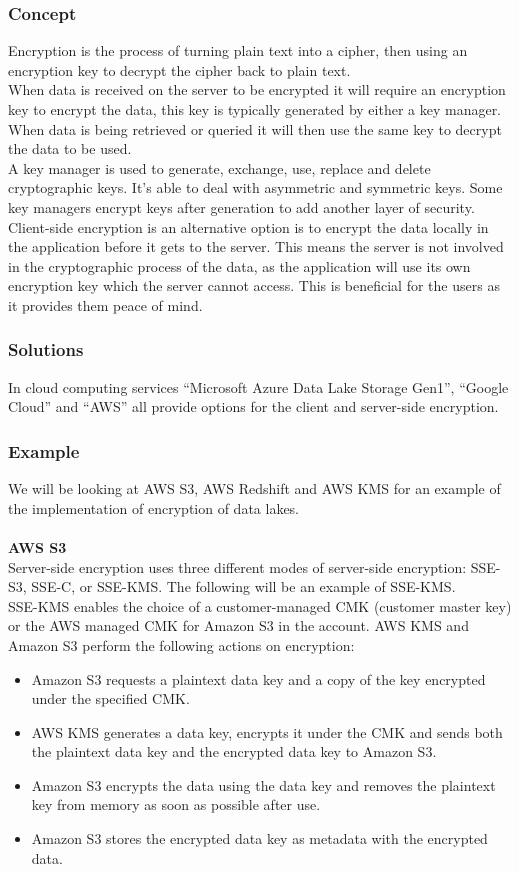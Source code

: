 \documentclass[10pt]{article}
\begin{document}
\subsubsection{Concept}
Encryption is the process of turning plain text into a cipher, then using an encryption key to decrypt the cipher back to plain text.
\\
When data is received on the server to be encrypted it will require an encryption key to encrypt the data, this key is typically generated by either a key manager. When data is being retrieved or queried it will then use the same key to decrypt the data to be used.
\\
A key manager is used to generate, exchange, use, replace and delete cryptographic keys. It's able to deal with asymmetric and symmetric keys. Some key managers encrypt keys after generation to add another layer of security.
\\
Client-side encryption is an alternative option is to encrypt the data locally in the application before it gets to the server. This means the server is not involved in the cryptographic process of the data, as the application will use its own encryption key which the server cannot access. This is beneficial for the users as it provides them peace of mind.
\subsubsection{Solutions}
In cloud computing services “Microsoft Azure Data Lake Storage Gen1”, “Google Cloud” and “AWS” all provide options for the client and server-side encryption.
\subsubsection{Example}
We will be looking at AWS S3, AWS Redshift and AWS KMS for an example of the implementation of encryption of data lakes.
\\\\\textbf{AWS S3}\\
Server-side encryption uses three different modes of server-side encryption: SSE-S3, SSE-C, or SSE-KMS. The following will be an example of SSE-KMS.
\\
SSE-KMS enables the choice of a customer-managed CMK (customer master key) or the AWS managed CMK for Amazon S3 in the account. AWS KMS and Amazon S3 perform the following actions on encryption:
\begin{itemize}
  \item Amazon S3 requests a plaintext data key and a copy of the key encrypted under the specified CMK.
  \item AWS KMS generates a data key, encrypts it under the CMK and sends both the plaintext data key and the encrypted data key to Amazon S3.
  \item Amazon S3 encrypts the data using the data key and removes the plaintext key from memory as soon as possible after use.
  \item Amazon S3 stores the encrypted data key as metadata with the encrypted data.
\end{itemize}
\end{document}
